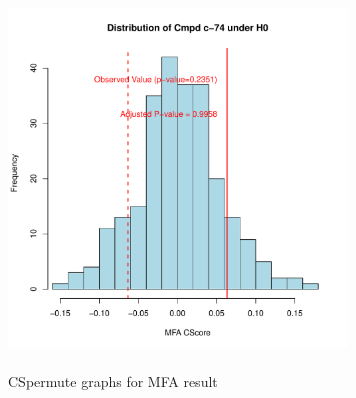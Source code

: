 \documentclass[a4paper]{article}\usepackage[]{graphicx}\usepackage[]{color}
\newenvironment{knitrout}{}{} %
\begin{document}
\begin{knitrout}
\begin{figure}[H]
\includegraphics[width=9cm,height=10cm]{figure/CSpermuteplots-3} \hfill{}

\caption[CSpermute graphs for MFA result]{CSpermute graphs for MFA result}\label{fig:CSpermuteplots}
\end{figure}


\end{knitrout}
\end{document}
